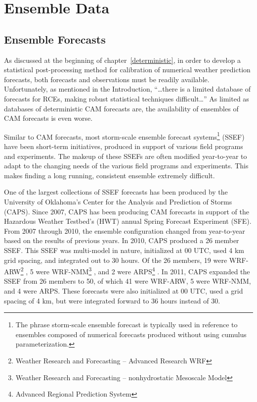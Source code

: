 

\section{Ensemble Data}
\label{edata}




\subsection{Ensemble Forecasts}
\label{emodel}

As discussed at the beginning of \mbox{chapter \ref{deterministic}}, in order to develop a statistical post-processing method for calibration of numerical weather prediction forecasts, both forecasts and observations must be readily available.
Unfortunately, as mentioned in the Introduction, ``\dots there is a limited database of forecasts for RCEs, making robust statistical techniques difficult\dots''
As limited as databases of deterministic CAM forecasts are, the availability of ensembles of CAM forecasts is even worse.


Similar to CAM forecasts, most storm-scale ensemble forecast systems\footnote{The phrase storm-scale ensemble forecast is typically used in reference to ensembles composed of numerical forecasts produced without using cumulus parameterization.} (SSEF) have been short-term initiatives, produced in support of various field programs and experiments.
The makeup of these SSEFs are often modified year-to-year to adapt to the changing needs of the various field programs and experiments.
This makes finding a long running, consistent ensemble extremely difficult.


One of the largest collections of SSEF forecasts has been produced by the University of Oklahoma's Center for the Analysis and Prediction of Storms (CAPS).
Since 2007, CAPS has been producing CAM forecasts in support of the Hazardous Weather Testbed's (HWT) annual Spring Forecast Experiment (SFE).
From 2007 through 2010, the ensemble configuration changed from year-to-year based on the results of previous years.
In 2010, CAPS produced a 26 member SSEF.
This SSEF was multi-model in nature, initialized at 00 UTC, used 4 km grid spacing, and integrated out to 30 hours.
Of the 26 members, 19 were WRF-ARW\footnote{Weather Research and Forecasting -- Advanced Research WRF} \citep{WRFV3}, 5 were WRF-NMM\footnote{Weather Research and Forecasting -- nonhydrostatic Mesoscale Model} \citep{NAMnWRF-NMM}, and 2 were ARPS\footnote{Advanced Regional Prediction System} \citep{ARPS}.
In 2011, CAPS expanded the SSEF from 26 members to 50, of which 41 were WRF-ARW, 5 were WRF-NMM, and 4 were ARPS.
These forecasts were also initialized at 00 UTC, used a grid spacing of 4 km, but were integrated forward to 36 hours instead of 30.


